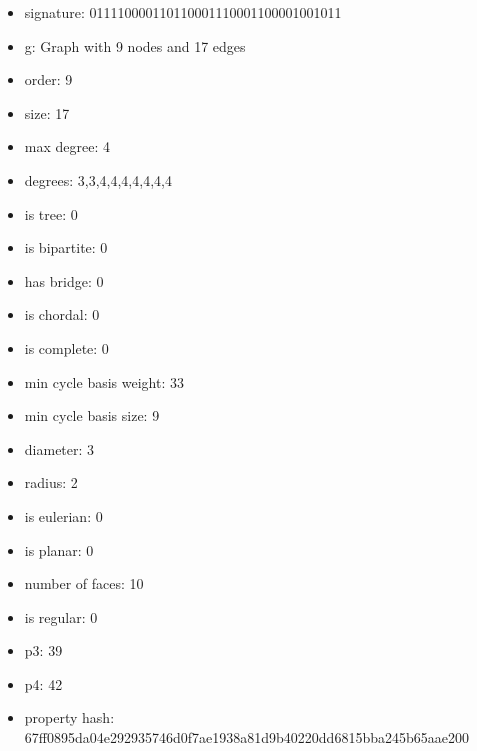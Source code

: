 \newpage
\begin{figure}
\end{figure}
\begin{itemize}
\item signature: 011110000110110001110001100001001011
\item g: Graph with 9 nodes and 17 edges
\item order: 9
\item size: 17
\item max degree: 4
\item degrees: 3,3,4,4,4,4,4,4,4
\item is tree: 0
\item is bipartite: 0
\item has bridge: 0
\item is chordal: 0
\item is complete: 0
\item min cycle basis weight: 33
\item min cycle basis size: 9
\item diameter: 3
\item radius: 2
\item is eulerian: 0
\item is planar: 0
\item number of faces: 10
\item is regular: 0
\item p3: 39
\item p4: 42
\item property hash: 67ff0895da04e292935746d0f7ae1938a81d9b40220dd6815bba245b65aae200
\end{itemize}
